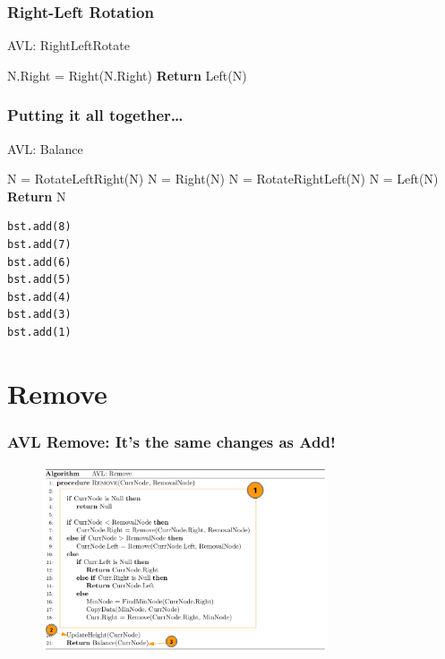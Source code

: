 \documentclass{beamer}
\begin{document}
\begin{frame}
    \frametitle{Right-Left Rotation}
    \vspace{4cm}
    \begin{algorithm}[H]
        \caption{AVL: RightLeftRotate}\label{}
        \begin{algorithmic}[1]
            \State N.Right = Right(N.Right)
            \State \textbf{Return} Left(N)
            \EndProcedure
        \end{algorithmic}
    \end{algorithm}
\end{frame}

\begin{frame}[fragile]
    \frametitle{Putting it all together\ldots}
    \begin{minipage}{0.49\textwidth}
        \begin{algorithm}[H]
            \caption{AVL: Balance}
            \tiny
            \begin{algorithmic}[1]
                \State N = RotateLeftRight(N)
                \Else
                \State N = Right(N)
                \EndIf
                \State N = RotateRightLeft(N)
                \Else
                \State N = Left(N)
                \EndIf
                \EndIf
                \State \textbf{Return} N
                \EndProcedure
            \end{algorithmic}
        \end{algorithm}
        \begin{lstlisting}[frame=trBL, basicstyle=\tiny]
bst.add(8)
bst.add(7)
bst.add(6)
bst.add(5)
bst.add(4)
bst.add(3)
bst.add(1)
        \end{lstlisting}
    \end{minipage}
    \begin{minipage}{0.49\textwidth}
        \hfill
    \end{minipage}
\end{frame}



\section{Remove}
\begin{frame}
    \frametitle{AVL Remove: It's the same changes as Add!}
    \vfill
    \begin{figure}
        \includegraphics[width=0.75\textwidth]{./imgs/avl-remove-algo-annotated.png}
    \end{figure}
    \vfill
\end{frame}
\end{document}
